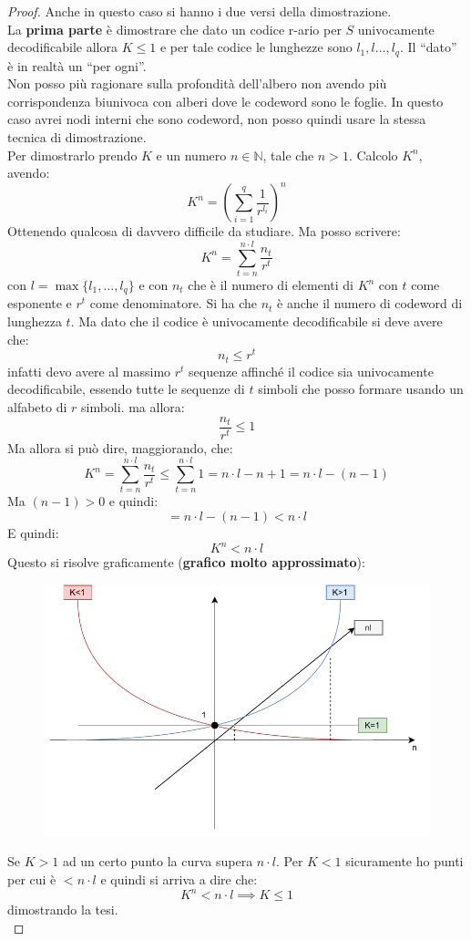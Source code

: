 \documentclass[a4paper,12pt, oneside]{book}
\begin{document}
\begin{proof}
  Anche in questo caso si hanno i due versi della dimostrazione.\\
  La \textbf{prima parte} è dimostrare che dato un codice r-ario per $S$
  univocamente decodificabile allora $K\leq 1$ e per tale codice le lunghezze
  sono $l_1,l\dots,l_q$. Il ``dato'' è in realtà un ``per ogni''.\\
  Non posso più ragionare sulla profondità dell'albero non avendo più
  corrispondenza biunivoca con alberi dove le codeword sono le foglie. In questo
  caso avrei nodi interni che sono codeword, non posso quindi usare la stessa
  tecnica di dimostrazione.\\
  Per dimostrarlo prendo $K$ e un numero $n\in\mathbb{N}$, tale che
  $n>1$. Calcolo $K^n$, avendo:
  \[K^n=\left(\sum_{i=1}^q\frac{1}{r^{l_i}}\right)^n\]
  Ottenendo qualcosa di davvero difficile da studiare. Ma posso scrivere:
  \[K^n=\sum_{t=n}^{n\cdot l}\frac{n_t}{r^{t}}\]
  con $l=\max\{l_1,\ldots,l_q\}$ e con $n_t$ che è il numero di elementi di
  $K^n$ con $t$ come esponente e $r^t$ come denominatore. Si ha che $n_t$ è
  anche il numero di codeword 
  di lunghezza $t$. Ma dato che il codice è univocamente decodificabile si deve
  avere che: 
  \[n_t\leq r^t\]
  infatti devo avere al massimo $r^t$ sequenze affinché il codice sia
  univocamente decodificabile, essendo tutte le sequenze di $t$ simboli
  che posso formare usando un alfabeto di $r$ simboli.  
  ma allora:
  \[\frac{n_t}{r^{t}}\leq 1\]
  Ma allora si può dire, maggiorando, che:
  \[K^n=\sum_{t=n}^{n\cdot l}\frac{n_t}{r^{t}}\leq \sum_{t=n}^{n\cdot
      l}1=n\cdot l-n+1=n\cdot l-(n-1)\]
  Ma $(n-1)>0$ e quindi:
  \[=n\cdot l-(n-1) < n\cdot l\]
  E quindi:
  \[K^n<n\cdot l\]
  \newpage
  Questo si risolve graficamente (\textbf{grafico molto approssimato}):
  \begin{figure}[H]
    \centering
    \includegraphics[scale = 0.8]{img/grap.pdf}
  \end{figure}
  Se $K>1$ ad un certo punto la curva supera $n\cdot l$. Per $K<1$ sicuramente
  ho punti per cui è $<n\cdot l$ e quindi si arriva a dire che:
  \[K^n<n\cdot l\implies K\leq 1\]
  dimostrando la tesi.\\
  

\end{proof}
\end{document}
